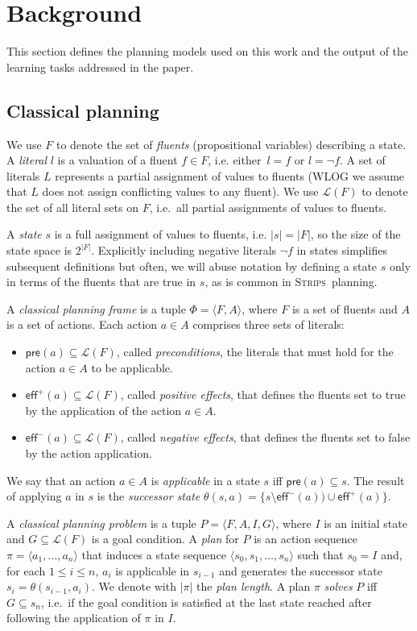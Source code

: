 \documentclass{article}
\newcommand{\tup}[1]{{\langle #1 \rangle}}
\newcommand{\pre}{\mathsf{pre}}     %
\newcommand{\eff}{\mathsf{eff}}     %
\newcommand{\strips}{\textsc{Strips}}     %
\begin{document}
\section{Background}
This section defines the planning models used on this work and the output of the learning tasks addressed in the paper.

\subsection{Classical planning}
We use $F$ to denote the set of {\em fluents} (propositional variables) describing a state. A {\em literal} $l$ is a valuation of a fluent $f\in F$, i.e. either~$l=f$ or $l=\neg f$. A set of literals $L$ represents a partial assignment of values to fluents (WLOG we assume that $L$ does not assign conflicting values to any fluent). We use $\mathcal{L}(F)$ to denote the set of all literal sets on $F$, i.e.~all partial assignments of values to fluents.

A {\em state} $s$ is a full assignment of values to fluents, i.e. $|s|=|F|$, so the size of the state space is $2^{|F|}$. Explicitly including negative literals $\neg f$ in states simplifies subsequent definitions but often, we will abuse notation by defining a state $s$ only in terms of the fluents that are true in $s$, as is common in \strips\ planning.

A {\em classical planning frame} is a tuple $\Phi=\tup{F,A}$, where $F$ is a set of fluents and $A$ is a set of actions. Each action $a\in A$ comprises three sets of literals:
\begin{itemize}
\item $\pre(a)\subseteq\mathcal{L}(F)$, called {\em preconditions}, the literals that must hold for the action $a\in A$ to be applicable.
\item $\eff^+(a)\subseteq\mathcal{L}(F)$, called {\em positive effects}, that defines the fluents set to true by the application of the action $a\in A$.
\item $\eff^-(a)\subseteq\mathcal{L}(F)$, called {\em negative effects}, that defines the fluents set to false by the action application.
\end{itemize}
We say that an action $a\in A$ is {\em applicable} in a state $s$ iff $\pre(a)\subseteq s$. The result of applying $a$ in $s$ is the {\em successor state} $\theta(s,a)=\{s\setminus\eff^-(a))\cup\eff^+(a)\}$.

A {\em classical planning problem} is a tuple $P=\tup{F,A,I,G}$, where $I$ is an initial state and $G\subseteq\mathcal{L}(F)$ is a goal condition. A {\em plan} for $P$ is an action sequence $\pi=\tup{a_1, \ldots, a_n}$ that induces a state sequence $\tup{s_0, s_1, \ldots, s_n}$ such that $s_0=I$ and, for each {\small $1\leq i\leq n$}, $a_i$ is applicable in $s_{i-1}$ and generates the successor state $s_i=\theta(s_{i-1},a_i)$. We denote with $|\pi|$ the {\em plan length}. A plan $\pi$ {\em solves} $P$ iff $G\subseteq s_n$, i.e.~if the goal condition is satisfied at the last state reached after following the application of $\pi$ in $I$.
\end{document}
